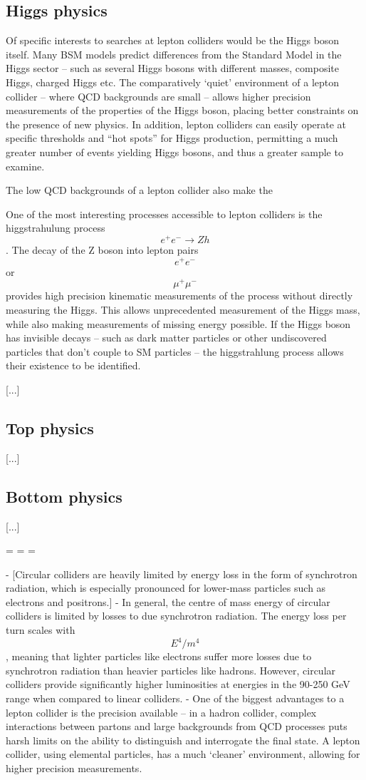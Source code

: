 \subsection{Higgs physics}
Of specific interests to searches at lepton colliders would be the Higgs boson itself. Many \acrshort{BSM} models predict differences from the Standard Model in the Higgs sector -- such as several Higgs bosons with different masses, composite Higgs, charged Higgs etc. The comparatively `quiet' environment of a lepton collider -- where \acrshort{QCD} backgrounds are small -- allows higher precision measurements of the properties of the Higgs boson, placing better constraints on the presence of new physics. In addition, lepton colliders can easily operate at specific thresholds and ``hot spots'' for Higgs production, permitting a much greater number of events yielding Higgs bosons, and thus a greater sample to examine.

The low QCD backgrounds of a lepton collider also make the 

One of the most interesting processes accessible to lepton colliders is the higgstrahulung process $$ e^+ e^- \rightarrow Zh $$. The decay of the Z boson into lepton pairs $$e^+ e^-$$ or $$\mu^+ \mu^-$$ provides high precision kinematic measurements of the process without directly measuring the Higgs. This allows unprecedented measurement of the Higgs mass, while also making measurements of missing energy possible. If the Higgs boson has invisible decays -- such as dark matter particles or other undiscovered particles that don't couple to \acrshort{SM} particles -- the higgstrahlung process allows their existence to be identified.

[...]

\subsection{Top physics}
[...]

\subsection{Bottom physics}
[...]


=	=	=

-
[Circular colliders are heavily limited by energy loss in the form of synchrotron radiation, which is especially pronounced for lower-mass particles such as electrons and positrons.]
-
In general, the centre of mass energy of circular colliders is limited by losses to due synchrotron radiation. The energy loss per turn scales with $$E^4 / m^4$$, meaning that lighter particles like electrons suffer more losses due to synchrotron radiation than heavier particles like hadrons. However, circular colliders provide significantly higher luminosities at energies in the 90-250 GeV range when compared to linear colliders. 
-
One of the biggest advantages to a lepton collider is the precision available -- in a hadron collider, complex interactions between partons and large backgrounds from \acrfull{QCD} processes puts harsh limits on the ability to distinguish and interrogate the final state. A lepton collider, using elemental particles, has a much `cleaner' environment, allowing for higher precision measurements.

